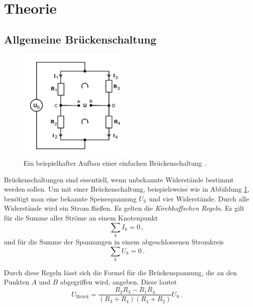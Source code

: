 \section{Theorie}
\label{sec:Theorie}

\subsection{Allgemeine Brückenschaltung}

\begin{figure}
    \centering
    \includegraphics[width=0.5\textwidth]{pictures/schaltung1.pdf}
    \caption{Ein beispielhafter Aufbau einer einfachen Brückenschaltung \cite[1]{v302}.}
    \label{fig:Schaltung1}
\end{figure}

Brückenschaltungen sind essentiell, wenn unbekannte Widerstände bestimmt werden sollen.
Um mit einer Brückenschaltung, beispielsweise wie in Abbildung \ref{fig:Schaltung1},
benötigt man eine bekannte Speisespannung $U_\text{S}$ und vier Widerstände.
Durch alle Widerstände wird ein Strom fließen.
Es gelten die \textit{Kirchhoffschen Regeln}.
Es gilt für die Summe aller Ströme an einem Knotenpunkt
\begin{equation} \label{eq:kirch1}
    \sum_k I_k = 0 \, ,
\end{equation}
und für die Summe der Spannungen in einem abgeschlossenen Stromkreis
\begin{equation} \label{eq:kirch2}
    \sum_k U_k = 0 \, .
\end{equation}

Durch diese Regeln lässt sich die Formel für die Brückenspannung, die an den Punkten $A$ und $B$ abgegriffen wird,
angeben. Diese lautet
\begin{equation}
    U_\text{Brück} = \frac {R_2 R_3 - R_1 R_4} {(R_3 + R_4)(R_1 + R_2)} U_\text{S} \, .
\end{equation}


